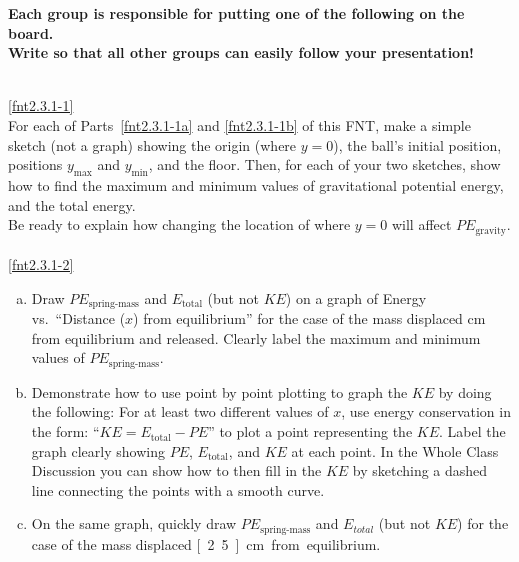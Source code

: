 \begin{center}\noindent\textbf{Each group is responsible for putting one of the following on the board.\\ Write so that all other groups can easily follow your presentation!}\end{center}

\noindent{}\\

\noindent\ref{fnt2.3.1-1}\\

\noindent For each of Parts~\eqref{fnt2.3.1-1a} and \eqref{fnt2.3.1-1b} of this FNT, make a simple sketch (not a graph) showing the origin 
(where $y = 0$), the ball's initial position, positions $y_\text{max}$ and $y_\text{min}$, and the floor. Then, for each of your two sketches, show how to find the maximum and minimum values of gravitational potential energy, and the total energy.\\

\noindent Be ready to explain how changing the location of where $y = 0$ will affect $PE_\text{gravity}$.\\

\noindent{}\\

\noindent\ref{fnt2.3.1-2}

\begin{enumerate}[(a)]
	\item Draw $PE_\text{spring-mass}$ and $E_\text{total}$ (but not $KE$) on a graph of Energy vs.\ ``Distance ($x$) from equilibrium'' for the case of the mass displaced \unit[5]{cm} from equilibrium and released. Clearly label the maximum and minimum values of $PE_\text{spring-mass}$.
	
	\item Demonstrate how to use point by point plotting to graph the $KE$ by doing the following: For at least two different values of $x$, use energy conservation in the form: ``$KE = E_\text{total} - PE$'' to plot a point representing the $KE$. Label the graph clearly showing $PE$, $E_\text{total}$, and $KE$ at each point. In the Whole Class Discussion you can show how to then fill in the $KE$ by sketching a dashed line connecting the points with a smooth curve.
	
	\item On the same graph, quickly draw $PE_\text{spring-mass}$ and $E_{total}$ (but not $KE$) for the case of the mass displaced \unit[2.5]{cm} from equilibrium.
\end{enumerate}

